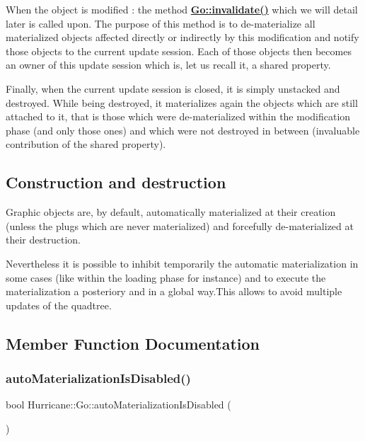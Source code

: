 When the object is modified \+: the method {\bfseries \mbox{\hyperlink{classHurricane_1_1Go_a5ee451e118fe8cace16989c0f3a6d855}{Go\+::invalidate()}}} which we will detail later is called upon. The purpose of this method is to de-\/materialize all materialized objects affected directly or indirectly by this modification and notify those objects to the current update session. Each of those objects then becomes an owner of this update session which is, let us recall it, a shared property.

Finally, when the current update session is closed, it is simply unstacked and destroyed. While being destroyed, it materializes again the objects which are still attached to it, that is those which were de-\/materialized within the modification phase (and only those ones) and which were not destroyed in between (invaluable contribution of the shared property).\hypertarget{classHurricane_1_1Go_secGoConstructionAndDestruction}{}\subsection{Construction and destruction}\label{classHurricane_1_1Go_secGoConstructionAndDestruction}
Graphic objects are, by default, automatically materialized at their creation (unless the plugs which are never materialized) and forcefully de-\/materialized at their destruction.

Nevertheless it is possible to inhibit temporarily the automatic materialization in some cases (like within the loading phase for instance) and to execute the materialization a posteriory and in a global way.\+This allows to avoid multiple updates of the quadtree. 

\subsection{Member Function Documentation}
\mbox{\label{classHurricane_1_1Go_a1057be4198a7b64c32a2ac3c7d560014}} 
\subsubsection{\texorpdfstring{auto\+Materialization\+Is\+Disabled()}{autoMaterializationIsDisabled()}}
{\footnotesize\ttfamily bool Hurricane\+::\+Go\+::auto\+Materialization\+Is\+Disabled (\begin{DoxyParamCaption}{ }\end{DoxyParamCaption})\hspace{0.3cm}{\ttfamily [static]}}

